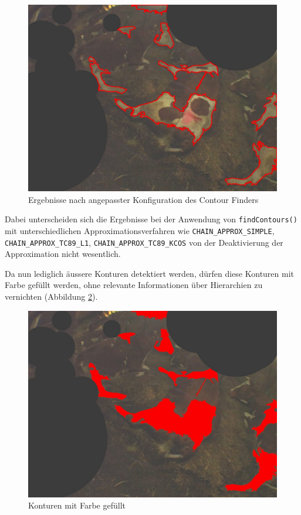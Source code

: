 \begin{figure}[H]
	\center
	\includegraphics[scale=0.43]{Grafiken/entwicklung/13SimpleThresholdingConoturOutlineLIST.jpg}
	\caption{Ergebnisse nach angepasster Konfiguration des Contour Finders} 
	\label{fig: Ergebnisse nach angepasster Konfiguration des Contour Finders} 
\end{figure}

Dabei unterscheiden sich die Ergebnisse bei der Anwendung von \texttt{findContours()} mit unterschiedlichen Approximationsverfahren wie \texttt{CHAIN_APPROX_SIMPLE}, \texttt{CHAIN_APPROX_TC89_L1}, \texttt{CHAIN_APPROX_TC89_KCOS} von der Deaktivierung der Approximation  nicht wesentlich.

Da nun lediglich äussere Konturen detektiert werden, dürfen diese Konturen mit Farbe gefüllt werden, ohne relevante Informationen über Hierarchien zu vernichten (Abbildung \ref{fig: Konturen mit Farbe gefüllt}).

\begin{figure}[H]
	\center
	\includegraphics[scale=0.43]{Grafiken/entwicklung/14AfterThresholdingContourFilled.jpg}
	\caption{Konturen mit Farbe gefüllt} 
	\label{fig: Konturen mit Farbe gefüllt} 
\end{figure}



